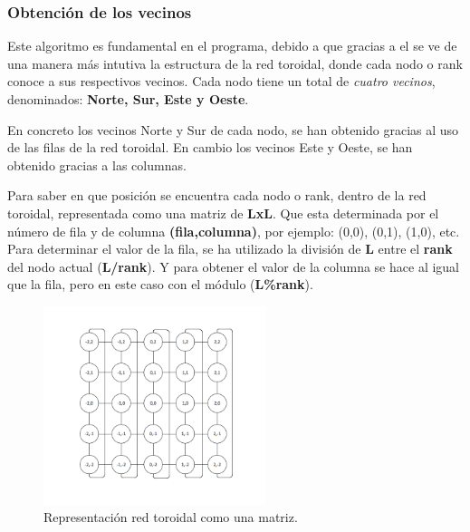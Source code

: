 \documentclass[11pt]{article}
\begin{document}
\subsubsection{Obtención de los vecinos}
Este algoritmo es fundamental en el programa, debido a que gracias a el se ve de una manera más intutiva la estructura de la red toroidal, donde cada nodo o rank conoce a sus respectivos vecinos. Cada nodo tiene un total de \textit{cuatro vecinos}, denominados: \textbf{Norte, Sur, Este y Oeste}.

En concreto los vecinos Norte y Sur de cada nodo, se han obtenido gracias al uso de las filas de la red toroidal. En cambio los vecinos Este y Oeste, se han obtenido gracias a las columnas.

Para saber en que posición se encuentra cada nodo o rank, dentro de la red toroidal, representada como una matriz de \textbf{LxL}. Que esta determinada por el número de fila y de columna \textbf{(fila,columna)}, por ejemplo: (0,0), (0,1), (1,0), etc.
Para determinar el valor de la fila, se ha utilizado la división de \textbf{L} entre el \textbf{rank} \cite{mpi_rank} del nodo actual (\textbf{L/rank}). Y para obtener el valor de la columna se hace al igual que la fila, pero en este caso con el módulo (\textbf{L\%rank}).

\begin{figure}[H]
  \centering
    \includegraphics[width=65mm]{matriz.png}
  \caption{Representación red toroidal como una matriz.}
  \label{fig:matriz}
\end{figure}
\end{document}
